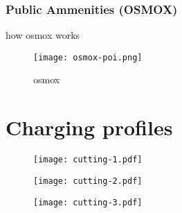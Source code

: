 \subsubsection{Public Ammenities (OSMOX)}

how osmox works
\begin{figure}[hb]
    \texttt{[image: osmox-poi.png]}
    \caption[osmox]{osmox}
    \label{fig:nn-latent}
\end{figure}


\section{Charging profiles}


\begin{figure}[hb]
    \texttt{[image: cutting-1.pdf]}
\end{figure}

\begin{figure}[hb]
    \texttt{[image: cutting-2.pdf]}
\end{figure}

\begin{figure}[hb]
    \texttt{[image: cutting-3.pdf]}
\end{figure}

